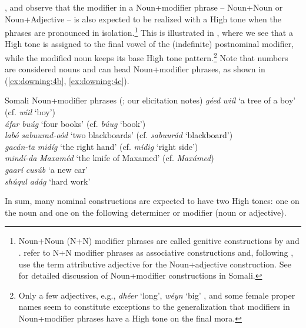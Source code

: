 \documentclass[output=paper]{langscibook}
\begin{document}
\citet{Green2016,Hyman1981}, and \citet{Saeed1993} observe that the modifier in a Noun+modifier phrase – Noun+Noun or Noun+Adjective – is also expected to be realized with a High tone when the phrases are pronounced in isolation.\footnote{Noun+Noun (N+N) modifier phrases are called genitive constructions by \citet{Hyman1981} and \citet{Saeed1993}. \citet{Green2016} refer to N+N modifier phrases as associative constructions and, following \citet{Saeed1993}, use the term attributive adjective for the Noun+adjective construction. See \citet{Saeed1993} for detailed discussion of Noun+modifier constructions in Somali.} This is illustrated in , where we see that a High tone is assigned to the final vowel of the (indefinite) postnominal modifier, while the modified noun keeps its base High tone pattern.\footnote{Only a few adjectives, e.g., \textit{dhéer} ‘long’, \textit{wéyn} ‘big’ \citep[105--106]{Saeed1999}, and some female proper names seem to constitute exceptions to the generalization that modifiers in Noun+modifier phrases have a High tone on the final mora.} Note that numbers are considered nouns \citep[123]{Saeed1993} and can head Noun+modifier phrases, as shown in (\ref{ex:downing:4b}, \ref{ex:downing:4c}).


\ea  Somali Noun+modifier phrases (\citealt{Hyman1981,Green2016}; our elicitation notes)  \label{ex:downing:4}
  \ea \textit{géed} \textit{wiíl}  ‘a tree of a boy’  (cf. \textit{wíil} ‘boy’) \label{ex:downing:4a}\\
  \ex \textit{áfar} \textit{buúg}  ‘four books’  (cf. \textit{búug} ‘book’)\label{ex:downing:4b}\\
  \ex \textit{labó} \textit{sabuurad-oód}  ‘two blackboards’  (cf. \textit{sabuurád} ‘blackboard’)\label{ex:downing:4c}\\
  \ex \textit{gacán-ta} \textit{midíg}  ‘the right hand’  (cf. \textit{mídig} ‘right side’)\label{ex:downing:4d}\\
  \ex \textit{mindí-da} \textit{Maxaméd}  ‘the knife of Maxamed’  (cf. \textit{Maxámed})\label{ex:downing:4e}\\
  \ex \textit{gaarí} \textit{cusúb}  ‘a new car’\label{ex:downing:4f}\\
  \ex \textit{shúqul} \textit{adág}  ‘hard work’\label{ex:downing:4g}\\
  \z
\z
 
In sum, many nominal constructions are expected to have two High tones: one on the noun and one on the following determiner or modifier (noun or adjective).
\end{document}

